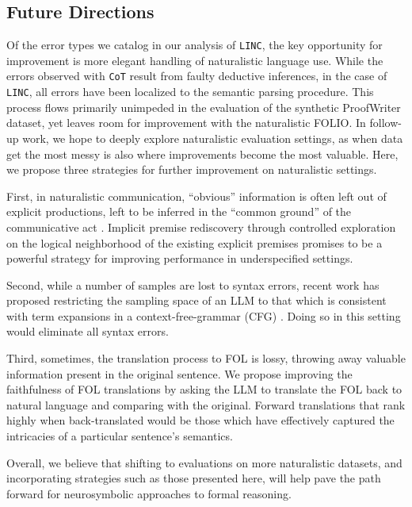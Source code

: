 \subsection{Future Directions}
\label{appendix:fw}

Of the error types we catalog in our analysis of \texttt{LINC}, the key opportunity for improvement is more elegant handling of naturalistic language use.
While the errors observed with \texttt{CoT} result from faulty deductive inferences, in the case of \texttt{LINC}, all errors have been localized to the semantic parsing procedure.
This process flows primarily unimpeded in the evaluation of the synthetic ProofWriter dataset, yet leaves room for improvement with the naturalistic FOLIO. 
In follow-up work, we hope to deeply explore naturalistic evaluation settings, as when data get the most messy is also where improvements become the most valuable. 
Here, we propose three strategies for further improvement on naturalistic settings.

First, in naturalistic communication, ``obvious'' information is often left out of explicit productions, left to be inferred in the ``common ground'' of the communicative act \citep{grice1975logic,stalnaker2002common}. 
Implicit premise rediscovery through controlled exploration on the logical neighborhood of the existing explicit premises promises to be a powerful strategy for improving performance in underspecified settings.

Second, while a number of samples are lost to syntax errors, recent work has proposed restricting the sampling space of an LLM to that which is consistent with term expansions in a context-free-grammar (CFG) \citep{poesia2022synchromesh}.
Doing so in this setting would eliminate all syntax errors.

Third, sometimes, the translation process to FOL is lossy, throwing away valuable information present in the original sentence.
We propose improving the faithfulness of FOL translations by asking the LLM to translate the FOL back to natural language and comparing with the original.
Forward translations that rank highly when back-translated would be those which have effectively captured the intricacies of a particular sentence's semantics.

Overall, we believe that shifting to evaluations on more naturalistic datasets, and incorporating strategies such as those presented here, will help pave the path forward for neurosymbolic approaches to formal reasoning.